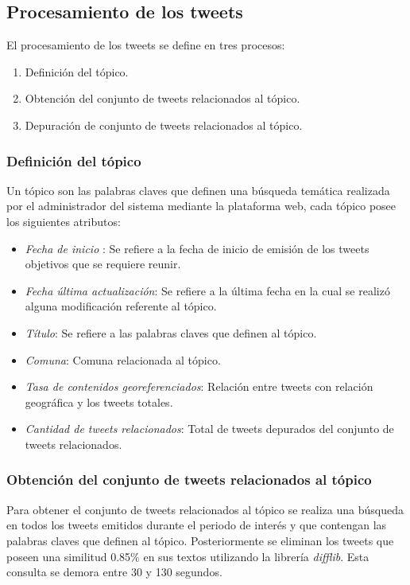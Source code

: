 \subsection{Procesamiento de los tweets}

El procesamiento de los tweets se define en tres procesos:
\begin{enumerate}
	\item{Definición del tópico.}
	\item{Obtención del conjunto de tweets relacionados al tópico.}
	\item{Depuración de conjunto de tweets relacionados al tópico.}
\end{enumerate}

\subsubsection{Definición del tópico}

Un tópico son las palabras claves que definen una búsqueda temática realizada por el administrador del sistema mediante la plataforma web, cada tópico posee los siguientes atributos:
\begin{itemize}
	\item \textit{Fecha de inicio} : Se refiere a la fecha de inicio de emisión de los tweets objetivos que se requiere reunir.
	\item \textit{Fecha última actualización}: Se refiere a la última fecha en la cual se realizó alguna modificación referente al tópico.
	\item \textit{Título}: Se refiere a las palabras claves que definen al tópico. 
	\item \textit{Comuna}: Comuna relacionada al tópico.
	\item \textit{Tasa de contenidos georeferenciados}: Relación entre tweets con relación geográfica y los tweets totales.
	\item \textit{Cantidad de tweets relacionados}: Total de tweets depurados del conjunto de tweets relacionados. 
\end{itemize}

\subsubsection{Obtención del conjunto de tweets relacionados al tópico}

Para obtener el conjunto de tweets relacionados al tópico se realiza una búsqueda en todos los tweets emitidos durante el periodo de interés
y que contengan las palabras claves que definen al tópico. Posteriormente se eliminan los tweets que poseen una similitud 0.85\% en sus textos 
utilizando la librería \emph{difflib}. Esta consulta se demora entre 30 y 130 segundos.

